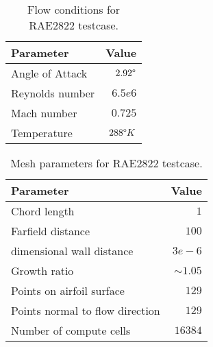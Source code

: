 \begin{table}[H]
    \centering
    \begin{tabular}{l r}
        \toprule
        Parameter                           & Value \\
        \hline
        Angle of Attack                     & $2.92 \degree$ \\
        Reynolds number                     & $6.5e6$ \\
        Mach number                         & $0.725$ \\
        Temperature                         & $288 \degree K$\\
        \bottomrule
    \end{tabular}
    \caption{Flow conditions for RAE2822 testcase.}
    \label{tab:flow_conditions_rae2822}
\end{table}

\begin{table}[H]
    \centering
    \begin{tabular}{l r}
        \toprule
        Parameter                           & Value \\
        \hline
        Chord length                        & $1$ \\
        Farfield distance                   & $100$ \\
        dimensional wall distance           & $3e-6$ \\
        Growth ratio                        & $\sim 1.05$ \\
        Points on airfoil surface           & $129$\\
        Points normal to flow direction     & $129$ \\
        Number of compute cells             & $16384$\\
        \bottomrule
    \end{tabular}
    \caption{Mesh parameters for RAE2822 testcase.}
    \label{tab:mesh_parameters_rae2822}
\end{table}



